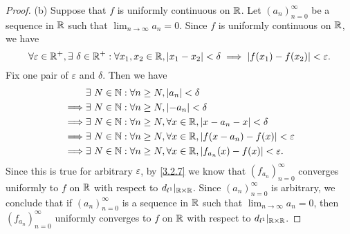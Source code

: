\begin{proof}{(b)}
  Suppose that \(f\) is uniformly continuous on \(\mathbb{R}\).
  Let \((a_n)_{n = 0}^\infty\) be a sequence in \(\mathbb{R}\) such that \(\lim_{n \to \infty} a_n = 0\).
  Since \(f\) is uniformly continuous on \(\mathbb{R}\), we have
  \[
    \forall \varepsilon \in \R^+, \exists\ \delta \in \R^+ : \forall x_1, x_2 \in \R, \abs{x_1 - x_2} < \delta \implies \abs{f(x_1) - f(x_2)} < \varepsilon.
  \]
  Fix one pair of \(\varepsilon\) and \(\delta\).
  Then we have
  \begin{align*}
             & \exists\ N \in \mathbb{N} : \forall n \geq N, \left\lvert a_n\right\rvert < \delta                                       \\
    \implies & \exists\ N \in \mathbb{N} : \forall n \geq N, \left\lvert-a_n\right\rvert < \delta                                      \\
    \implies & \exists\ N \in \mathbb{N} : \forall n \geq N, \forall x \in \mathbb{R}, \left\lvert x - a_n - x\right\rvert < \delta             \\
    \implies & \exists\ N \in \mathbb{N} : \forall n \geq N, \forall x \in \mathbb{R}, \left\lvert f(x - a_n) - f(x)\right\rvert < \varepsilon  \\
    \implies & \exists\ N \in \mathbb{N} : \forall n \geq N, \forall x \in \mathbb{R}, \left\lvert f_{a_n}(x) - f(x)\right\rvert < \varepsilon.
  \end{align*}
  Since this is true for arbitrary \(\varepsilon\), by \cref{3.2.7} we know that \((f_{a_n})_{n = 0}^\infty\) converges uniformly to \(f\) on \(\mathbb{R}\) with respect to \(d_{l^1}|_{\mathbb{R} \times \mathbb{R}}\).
  Since \((a_n)_{n = 0}^\infty\) is arbitrary, we conclude that if \((a_n)_{n = 0}^\infty\) is a sequence in \(\mathbb{R}\) such that \(\lim_{n \to \infty} a_n = 0\), then \((f_{a_n})_{n = 0}^\infty\) uniformly converges to \(f\) on \(\mathbb{R}\) with respect to \(d_{l^1}|_{\mathbb{R} \times \mathbb{R}}\).


\end{proof}

